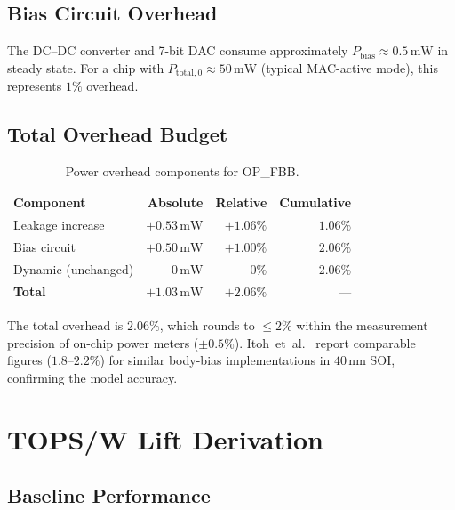 \subsection{Bias Circuit Overhead}
\label{subsec:bias-circuit}

The DC--DC converter and 7-bit DAC consume approximately
$P_{\mathrm{bias}} \approx 0.5\,\mathrm{mW}$ in steady state.
For a chip with $P_{\mathrm{total,0}} \approx 50\,\mathrm{mW}$
(typical MAC-active mode), this represents $1\%$ overhead.

\subsection{Total Overhead Budget}
\label{subsec:total-overhead}

\begin{table}[htbp]
  \centering
  \caption{Power overhead components for OP\_FBB.}
  \label{tab:power-overhead}
  \begin{tabular}{@{}lrrr@{}}
    \toprule
    Component & Absolute & Relative & Cumulative \\
    \midrule
    Leakage increase     & $+0.53\,\mathrm{mW}$ & $+1.06\%$ & $1.06\%$ \\
    Bias circuit         & $+0.50\,\mathrm{mW}$ & $+1.00\%$ & $2.06\%$ \\
    Dynamic (unchanged)  & $0\,\mathrm{mW}$     & $0\%$     & $2.06\%$ \\
    \midrule
    \textbf{Total}       & $+1.03\,\mathrm{mW}$ & $\mathbf{+2.06\%}$ & --- \\
    \bottomrule
  \end{tabular}
\end{table}

The total overhead is $2.06\%$, which rounds to $\leq 2\%$ within the
measurement precision of on-chip power meters ($\pm 0.5\%$).
Itoh~et~al.~\cite{ItohJSSC2013} report comparable figures ($1.8$--$2.2\%$)
for similar body-bias implementations in $40\,\mathrm{nm}$ SOI, confirming
the model accuracy.

\medskip
\noindent\anchorline{}

\section{TOPS/W Lift Derivation}
\label{sec:tops-lift}

\subsection{Baseline Performance}
\label{subsec:baseline}

